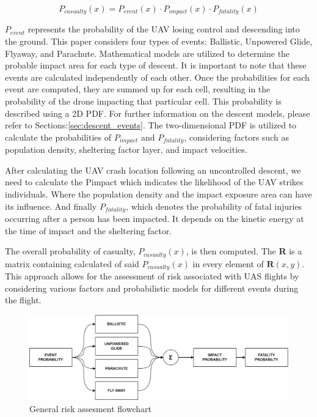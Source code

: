 \documentclass[12pt]{report}
\begin{document}
        \begin{equation}
            P_{casualty}(x) = P_{event}(x) \cdot P_{impact}(x) \cdot P_{fatality}(x)
        \end{equation}

        \(P_{event}\) represents the probability of the UAV losing control and descending into the ground. This paper
        considers four types of events: Ballistic, Unpowered Glide, Flyaway, and Parachute. Mathematical models are
        utilized to determine the probable impact area for each type of descent. It is important to note that these
        events are calculated independently of each other. Once the probabilities for each event are computed, they are
        summed up for each cell, resulting in the probability of the drone impacting that particular cell. This
        probability is described using a 2D \ac{PDF}. For further information on the descent
        models, please refer to Sections:\ref{sec:descent_events}. The two-dimensional PDF is utilized to calculate the
        probabilities of \(P_{impact}\) and \(P_{fatality}\), considering factors such as population density, sheltering
        factor layer, and impact velocities.

        After calculating the UAV crash location following an uncontrolled descent, we need to calculate the Pimpact
        which indicates the likelihood of the UAV strikes individuals. Where the population density and the impact
        exposure area can have its influence. And finally \(P_{fatality}\), which denotes the probability of fatal
        injuries occurring after a person has been impacted. It depends on the kinetic energy at the time of impact and
        the sheltering factor.

        The overall probability of casualty, \(P_{casualty}(x)\), is then computed. The \textbf{R} is a matrix
        containing calculated of said \(P_{casualty}(x)\) in every element of \(\mathbf{R}(x, y)\). This approach allows
        for the assessment of risk associated with UAS flights by considering various factors and probabilistic models
        for different events during the flight.

        \begin{figure}[H]
            \centering
            \includegraphics[width=\textwidth]{General Image/OSM Drone-LOGIC_SUM.png}
            \caption{General risk assesment flowchart}
        \end{figure}
\end{document}

